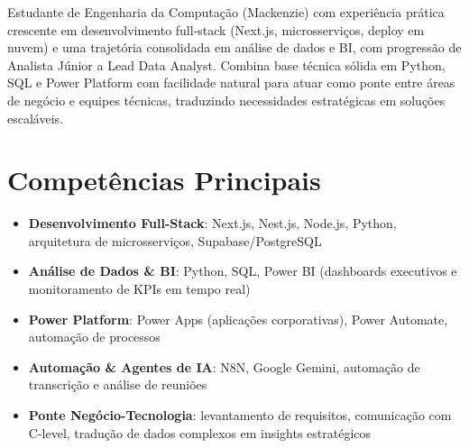\documentclass[11pt,a4paper,sans]{moderncv}
\begin{document}
\makecvtitle


\vspace{6pt}
\small{Estudante de Engenharia da Computação (Mackenzie) com experiência prática crescente em desenvolvimento full-stack (Next.js, microsserviços, deploy em nuvem) e uma trajetória consolidada em análise de dados e BI, com progressão de Analista Júnior a Lead Data Analyst. Combina base técnica sólida em Python, SQL e Power Platform com facilidade natural para atuar como ponte entre áreas de negócio e equipes técnicas, traduzindo necessidades estratégicas em soluções escaláveis.}


\section{Competências Principais}
\vspace{1pt}
\begin{itemize}

\item \textbf{Desenvolvimento Full-Stack}: Next.js, Nest.js, Node.js, Python, arquitetura de microsserviços, Supabase/PostgreSQL

\item \textbf{Análise de Dados \& BI}: Python, SQL, Power BI (dashboards executivos e monitoramento de KPIs em tempo real)

\item \textbf{Power Platform}: Power Apps (aplicações corporativas), Power Automate, automação de processos

\item \textbf{Automação \& Agentes de IA}: N8N, Google Gemini, automação de transcrição e análise de reuniões

\item \textbf{Ponte Negócio-Tecnologia}: levantamento de requisitos, comunicação com C-level, tradução de dados complexos em insights estratégicos

\end{itemize}

\end{document}
